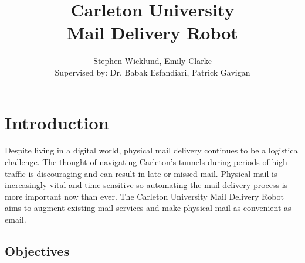 \documentclass[12pt]{report}
\begin{document}
    
    \title{Carleton University
    \\ Mail Delivery Robot}
    \author{Stephen Wicklund, Emily Clarke \\{\small Supervised by: Dr. Babak Esfandiari, Patrick Gavigan}}
     \copyrightfalse %

    \beforepreface



    \prefaceTOC   %
    \prefaceLOF   %
    \prefaceLOT   %



\endpreface
	
%

\chapter{Introduction}
Despite living in a digital world, physical mail delivery continues to be a logistical challenge. The thought of navigating Carleton's tunnels during periods of high traffic is discouraging and can result in late or missed mail. Physical mail is increasingly vital and time sensitive so automating the mail delivery process is more important now than ever. The Carleton University Mail Delivery Robot aims to augment existing mail services and make physical mail as convenient as email.

\section{Objectives}
\end{document}
